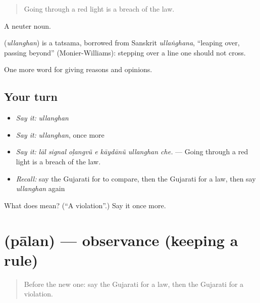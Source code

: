 \begin{quote}
Going through a red light is a breach of the law.
\end{quote}

A neuter noun.

\begin{cousinweb}
\textbf{} (\emph{ullanghan}) is a tatsama, borrowed from Sanskrit \emph{ullaṅghana}, \textquotedblleft{}leaping over, passing beyond\textquotedblright{} (Monier-Williams): stepping over a line one should not cross.
\end{cousinweb}

\begin{grammarlens}[title={What you've built}]
One more word for giving reasons and opinions.
\end{grammarlens}

\subsection*{Your turn}
\begin{itemize}
\raggedright
  \item \emph{Say it:} \emph{ullanghan}
  \item \emph{Say it:} \emph{ullanghan}, once more
  \item \emph{Say it:} \emph{lāl signal oḷangvũ e kāydānũ ullanghan che.} — Going through a red light is a breach of the law.
  \item \emph{Recall:} say the Gujarati for to compare, then the Gujarati for a law, then say \emph{ullanghan} again
\end{itemize}

\begin{tcolorbox}[breakable,colback=teal!4,colframe=teal!35!black,title={Before you move on}]
What does  mean? (\textquotedblleft{}A violation\textquotedblright{}.) Say it once more.
\end{tcolorbox}
\section[\texorpdfstring{\gu{પાલન} (pālan)}{પાલન (pālan)}]{ (pālan) — observance (keeping a rule)}

\label{lesson:GU-C347-palan}



\begin{quote}
Before the new one: say the Gujarati for a law, then the Gujarati for a violation.
\end{quote}

